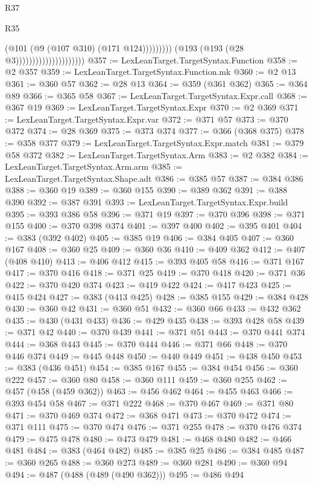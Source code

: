 \begin{lexlean}{R37}
\begin{lexlean}{R35}
\begin{coremodule}
{{{{{{{{{{{{{{{{{{{{{{{{{{{{{{{{{{{{{{{{{{{{{{{{{{{{                                                    (@101 (@9 (@107 @310) (@171 @124)))))))))
                                        (@193 (@193 (@28 @3)))))))))))))))))))))
@357 := LexLeanTarget.TargetSyntax.Function
@358 := @2 @357
@359 := LexLeanTarget.TargetSyntax.Function.mk
@360 := @2 @13
@361 := @360 @57
@362 := @28 @13
@364 := @359 (@361 @362)
@365 := @364 @89
@366 := @365 @58
@367 := LexLeanTarget.TargetSyntax.Expr.call
@368 := @367 @19
@369 := LexLeanTarget.TargetSyntax.Expr
@370 := @2 @369
@371 := LexLeanTarget.TargetSyntax.Expr.var
@372 := @371 @57
@373 := @370 @372
@374 := @28 @369
@375 := @373 @374
@377 := @366 (@368 @375)
@378 := @358 @377
@379 := LexLeanTarget.TargetSyntax.Expr.match
@381 := @379 @58 @372
@382 := LexLeanTarget.TargetSyntax.Arm
@383 := @2 @382
@384 := LexLeanTarget.TargetSyntax.Arm.arm
@385 := LexLeanTarget.TargetSyntax.Shape.adt
@386 := @385 @57
@387 := @384 @386
@388 := @360 @19
@389 := @360 @155
@390 := @389 @362
@391 := @388 @390
@392 := @387 @391
@393 := LexLeanTarget.TargetSyntax.Expr.build
@395 := @393 @386 @58
@396 := @371 @19
@397 := @370 @396
@398 := @371 @155
@400 := @370 @398 @374
@401 := @397 @400
@402 := @395 @401
@404 := @383 (@392 @402)
@405 := @385 @19
@406 := @384 @405
@407 := @360 @167
@408 := @360 @25
@409 := @360 @36
@410 := @409 @362
@412 := @407 (@408 @410)
@413 := @406 @412
@415 := @393 @405 @58
@416 := @371 @167
@417 := @370 @416
@418 := @371 @25
@419 := @370 @418
@420 := @371 @36
@422 := @370 @420 @374
@423 := @419 @422
@424 := @417 @423
@425 := @415 @424
@427 := @383 (@413 @425)
@428 := @385 @155
@429 := @384 @428
@430 := @360 @42
@431 := @360 @51
@432 := @360 @66
@433 := @432 @362
@435 := @430 (@431 @433)
@436 := @429 @435
@438 := @393 @428 @58
@439 := @371 @42
@440 := @370 @439
@441 := @371 @51
@443 := @370 @441 @374
@444 := @368 @443
@445 := @370 @444
@446 := @371 @66
@448 := @370 @446 @374
@449 := @445 @448
@450 := @440 @449
@451 := @438 @450
@453 := @383 (@436 @451)
@454 := @385 @167
@455 := @384 @454
@456 := @360 @222
@457 := @360 @80
@458 := @360 @111
@459 := @360 @255
@462 := @457 (@458 (@459 @362))
@463 := @456 @462
@464 := @455 @463
@466 := @393 @454 @58
@467 := @371 @222
@468 := @370 @467
@469 := @371 @80
@471 := @370 @469 @374
@472 := @368 @471
@473 := @370 @472
@474 := @371 @111
@475 := @370 @474
@476 := @371 @255
@478 := @370 @476 @374
@479 := @475 @478
@480 := @473 @479
@481 := @468 @480
@482 := @466 @481
@484 := @383 (@464 @482)
@485 := @385 @25
@486 := @384 @485
@487 := @360 @265
@488 := @360 @273
@489 := @360 @281
@490 := @360 @94
@494 := @487 (@488 (@489 (@490 @362)))
@495 := @486 @494
}}}}}}}}}}}}}}}}}}}}}}}}}}}}}}}}}}}}}}}}}}}}}}}}}}}}
\end{coremodule}
\end{lexlean}
\end{lexlean}
